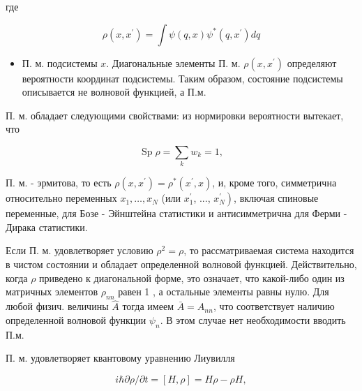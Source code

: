 \documentclass[10pt]{article}
\begin{document}
где



\[

\rho\left(x, x^{\prime}\right)=\int \psi(q, x) \psi^{*}\left(q, x^{\prime}\right) d q

\]



\begin{itemize}

  \item П. м. подсистемы $x$. Диагональные элементы П. м. $\rho\left(x, x^{\prime}\right)$ определяют вероятности координат подсистемы. Таким образом, состояние подсистемы описывается не волновой функцией, а П.м.

\end{itemize}



П. м. обладает следующими свойствами: из нормировки вероятности вытекает, что



\[

\operatorname{Sp} \rho=\sum_{k} w_{k}=1,

\]



П. м. - эрмитова, то есть $\rho\left(x, x^{\prime}\right)=\rho^{*}\left(x^{\prime}, x\right)$, и, кроме того, симметрична относительно переменных $x_{1}, \ldots, x_{N}$ (или $x_{1}^{\prime}$, ..., $\left.x_{N}^{\prime}\right)$, включая спиновые переменные, для Бозе - Эйнштейна статистики и антисимметрична для Ферми - Дирака статистики.



Если П. м. удовлетворяет условию $\rho^{2}=\rho$, то рассматриваемая система находится в чистом состоянии и обладает определенной волновой функцией. Действительно, когда $\rho$ приведено к диагональной форме, это означает, что какой-либо один из матричных элементов $\rho_{n n}$ равен 1 , а остальные элементы равны нулю. Для любой физич. величины $\hat{A}$ тогда имеем $\bar{A}=A_{n n}$, что соответствует наличию определенной волновой функции $\psi_{n}$. В этом случае нет необходимости вводить П.м.



П. м. удовлетворяет квантовому уравнению Лиувилля



\[

i \hbar \partial \rho / \partial t=[H, \rho]=H \rho-\rho H,

\]
\end{document}
